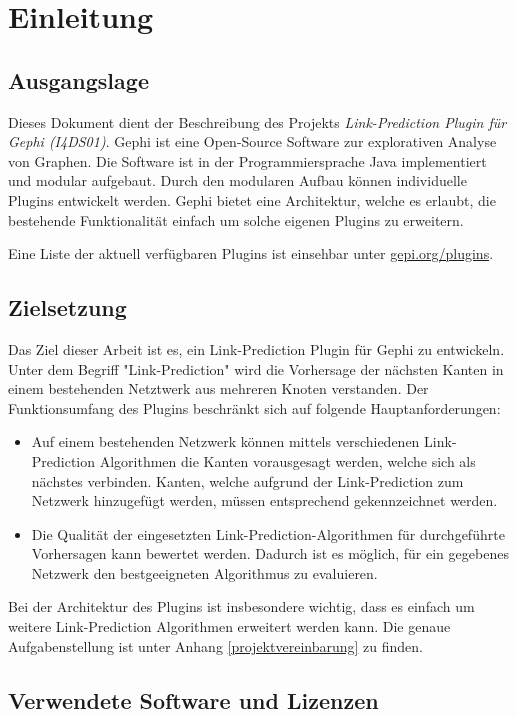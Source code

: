 \chapter{Einleitung}
\section{Ausgangslage}
Dieses Dokument dient der Beschreibung des Projekts \textit{Link-Prediction Plugin für Gephi (I4DS01)}.
Gephi ist eine Open-Source Software zur explorativen Analyse von Graphen. Die Software ist in der Programmiersprache Java implementiert und modular aufgebaut. Durch den modularen Aufbau können individuelle Plugins entwickelt werden. Gephi bietet eine Architektur, welche es erlaubt, die bestehende Funktionalität einfach um solche eigenen Plugins zu erweitern.

Eine Liste der aktuell verfügbaren Plugins ist einsehbar unter \href{https://gephi.org/plugins}{gepi.org/plugins}.

\section{Zielsetzung}

Das Ziel dieser Arbeit ist es, ein Link-Prediction Plugin für Gephi zu entwickeln. Unter dem Begriff "Link-Prediction" wird die Vorhersage der nächsten Kanten in einem bestehenden Netztwerk aus mehreren Knoten verstanden.
Der Funktionsumfang des Plugins beschränkt sich auf folgende Hauptanforderungen:

\begin{itemize}
    \item Auf einem bestehenden Netzwerk können mittels verschiedenen Link-Prediction Algorithmen die Kanten vorausgesagt werden, welche sich als nächstes verbinden. Kanten, welche aufgrund der Link-Prediction zum Netzwerk hinzugefügt werden, müssen entsprechend gekennzeichnet werden.
    \item Die Qualität der eingesetzten Link-Prediction-Algorithmen für durchgeführte Vorhersagen kann bewertet werden. Dadurch ist es möglich, für ein gegebenes Netzwerk den bestgeeigneten Algorithmus zu evaluieren.
\end{itemize}

Bei der Architektur des Plugins ist insbesondere wichtig, dass es einfach um weitere Link-Prediction Algorithmen erweitert werden kann.
Die genaue Aufgabenstellung ist unter Anhang \ref{projektvereinbarung} zu finden.

\section{Verwendete Software und Lizenzen}

